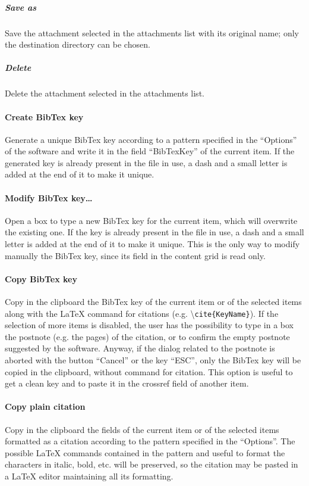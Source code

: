 \documentclass[a4paper,12pt]{report}
\begin{document}
\subparagraph{Save as} Save the attachment selected in the attachments list with its original name; only the destination directory can be chosen.

\subparagraph{Delete} Delete the attachment selected in the attachments list.

\paragraph{Create BibTex key} Generate a unique BibTex key according to a pattern specified in the “Options” of the software and write it in the field “BibTexKey” of the current item. If the generated key is already present in the file in use, a dash and a small letter is added at the end of it to make it unique.

\paragraph{Modify BibTex key\dots} Open a box to type a new BibTex key for the current item, which will overwrite the existing one. If the key is already present in the file in use, a dash and a small letter is added at the end of it to make it unique. This is the only way to modify manually the BibTex key, since its field in the content grid is read only.

\paragraph{Copy BibTex key} Copy in the clipboard the BibTex key of the current item or of the selected items along with the LaTeX command for citations (e.g. \textbackslash \texttt{cite\{KeyName\}}). If the selection of more items is disabled, the user has the possibility to type in a box the postnote (e.g. the pages) of the citation, or to confirm the empty postnote suggested by the software. Anyway, if the dialog related to the postnote is aborted with the button “Cancel” or the key “ESC”, only the BibTex key will be copied in the clipboard, without command for citation. This option is useful to get a clean key and to paste it in the crossref field of another item.

\paragraph{Copy plain citation} Copy in the clipboard the fields of the current item or of the selected items formatted as a citation according to the pattern specified in the “Options”. The possible LaTeX commands contained in the pattern and useful to format the characters in italic, bold, etc. will be preserved, so the citation may be pasted in a LaTeX editor maintaining all its formatting.
\end{document}
